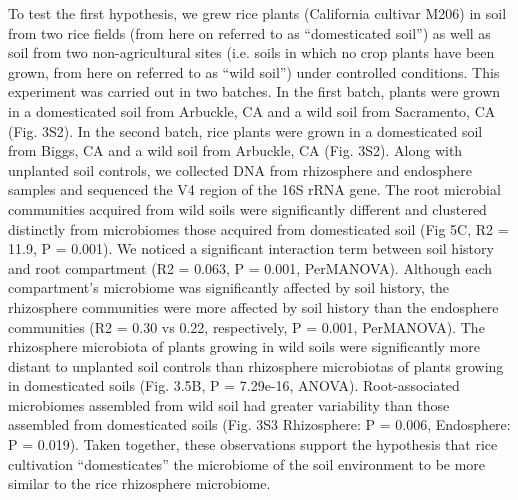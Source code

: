 To test the first hypothesis, we grew rice plants (California cultivar M206) in soil from two rice fields (from here on referred to as ``domesticated soil'') as well as soil from two non-agricultural sites (i.e. soils in which no crop plants have been grown, from here on referred to as ``wild soil'') under controlled conditions. This experiment was carried out in two batches. In the first batch, plants were grown in a domesticated soil from Arbuckle, CA and a wild soil from Sacramento, CA (Fig. 3S2). In the second batch, rice plants were grown in a domesticated soil from Biggs, CA and a wild soil from Arbuckle, CA (Fig. 3S2). Along with unplanted soil controls, we collected DNA from rhizosphere and endosphere samples and sequenced the V4 region of the 16S rRNA gene. The root microbial communities acquired from wild soils were significantly different and clustered distinctly from microbiomes those acquired from domesticated soil (Fig 5C, R2 = 11.9, P = 0.001). We noticed a significant interaction term between soil history and root compartment (R2 = 0.063, P = 0.001, PerMANOVA). Although each compartment's microbiome was significantly affected by soil history, the rhizosphere communities were more affected by soil history than the endosphere communities (R2 = 0.30 vs 0.22, respectively, P = 0.001, PerMANOVA). The rhizosphere microbiota of plants growing in wild soils were significantly more distant to unplanted soil controls than rhizosphere microbiotas of plants growing in domesticated soils (Fig. 3.5B, P = 7.29e-16, ANOVA). Root-associated microbiomes assembled from wild soil had greater variability than those assembled from domesticated soils (Fig. 3S3 Rhizosphere: P = 0.006, Endosphere: P = 0.019). Taken together, these observations support the hypothesis that rice cultivation “domesticates” the microbiome of the soil environment to be more similar to the rice rhizosphere microbiome.

